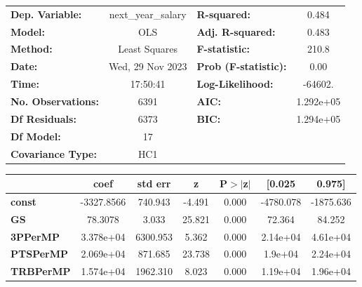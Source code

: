 \begin{center}
\begin{tabular}{lclc}
\toprule
\textbf{Dep. Variable:}             & next\_year\_salary & \textbf{  R-squared:         } &     0.484   \\
\textbf{Model:}                     &        OLS         & \textbf{  Adj. R-squared:    } &     0.483   \\
\textbf{Method:}                    &   Least Squares    & \textbf{  F-statistic:       } &     210.8   \\
\textbf{Date:}                      &  Wed, 29 Nov 2023  & \textbf{  Prob (F-statistic):} &     0.00    \\
\textbf{Time:}                      &      17:50:41      & \textbf{  Log-Likelihood:    } &   -64602.   \\
\textbf{No. Observations:}          &         6391       & \textbf{  AIC:               } & 1.292e+05   \\
\textbf{Df Residuals:}              &         6373       & \textbf{  BIC:               } & 1.294e+05   \\
\textbf{Df Model:}                  &           17       & \textbf{                     } &             \\
\textbf{Covariance Type:}           &        HC1         & \textbf{                     } &             \\
\bottomrule
\end{tabular}
\begin{tabular}{lcccccc}
                                    & \textbf{coef} & \textbf{std err} & \textbf{z} & \textbf{P$> |$z$|$} & \textbf{[0.025} & \textbf{0.975]}  \\
\midrule
\textbf{const}                      &   -3327.8566  &      740.943     &    -4.491  &         0.000        &    -4780.078    &    -1875.636     \\
\textbf{GS}                         &      78.3078  &        3.033     &    25.821  &         0.000        &       72.364    &       84.252     \\
\textbf{3PPerMP}                    &    3.378e+04  &     6300.953     &     5.362  &         0.000        &     2.14e+04    &     4.61e+04     \\
\textbf{PTSPerMP}                   &    2.069e+04  &      871.685     &    23.738  &         0.000        &      1.9e+04    &     2.24e+04     \\
\textbf{TRBPerMP}                   &    1.574e+04  &     1962.310     &     8.023  &         0.000        &     1.19e+04    &     1.96e+04     \\

\end{tabular}
\end{center}
